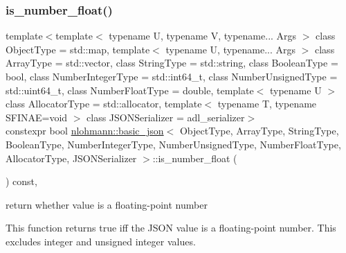 \mbox{\label{classnlohmann_1_1basic__json_a33b4bf898b857c962e798fc7f6e86e70}} 
\subsubsection{\texorpdfstring{is\_number\_float()}{is\_number\_float()}}
{\footnotesize\ttfamily template$<$template$<$ typename U, typename V, typename... Args $>$ class Object\+Type = std\+::map, template$<$ typename U, typename... Args $>$ class Array\+Type = std\+::vector, class String\+Type  = std\+::string, class Boolean\+Type  = bool, class Number\+Integer\+Type  = std\+::int64\+\_\+t, class Number\+Unsigned\+Type  = std\+::uint64\+\_\+t, class Number\+Float\+Type  = double, template$<$ typename U $>$ class Allocator\+Type = std\+::allocator, template$<$ typename T, typename S\+F\+I\+N\+A\+E=void $>$ class J\+S\+O\+N\+Serializer = adl\+\_\+serializer$>$ \\
constexpr bool \mbox{\hyperlink{classnlohmann_1_1basic__json}{nlohmann\+::basic\+\_\+json}}$<$ Object\+Type, Array\+Type, String\+Type, Boolean\+Type, Number\+Integer\+Type, Number\+Unsigned\+Type, Number\+Float\+Type, Allocator\+Type, J\+S\+O\+N\+Serializer $>$\+::is\+\_\+number\+\_\+float (\begin{DoxyParamCaption}{ }\end{DoxyParamCaption}) const\hspace{0.3cm}{\ttfamily [inline]}, {\ttfamily [noexcept]}}



return whether value is a floating-\/point number 

This function returns true iff the J\+S\+ON value is a floating-\/point number. This excludes integer and unsigned integer values.

